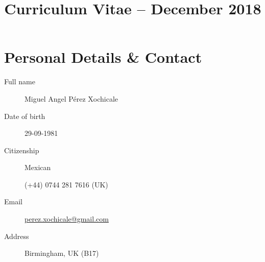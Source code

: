 \documentclass[10pt,a4paper,roman]{moderncv}
\title{Curriculum Vitae -- December 2018}
\begin{document}
%
%
\makecvtitle



%


\vspace{-15mm}


\section{Personal Details \& Contact}
%

\begin{changemargin}{2.4cm}{0.5cm}
  \begin{minipage}{.4\textwidth}
    \begin{description}
	\item[Full name] Miguel Angel P\'erez Xochicale
     	\item[Date of birth] 29-09-1981
	\item[Citizenship] Mexican
     \end{description}
  \end{minipage}
  \begin{minipage}{.4\textwidth}
  \begin{description}
     	\item[\faMobile ]  (+44) 0744 281 7616 (UK)
	\item[Email]  \href{perez.xochicale@ gmail.com}{perez.xochicale@gmail.com}
	\item[Address] Birmingham, UK (B17)
   \end{description}
  \end{minipage}
\end{changemargin}
\end{document}
